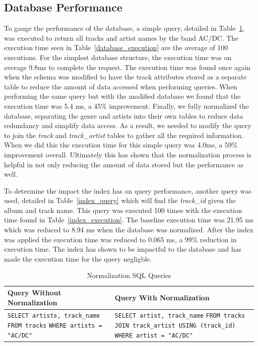 \documentclass{article}
\begin{document}
\subsection{Database Performance}
To gauge the performance of the database, a simple query, detailed in Table~\ref{database_query}, was executed to return all tracks and artist names by the band AC/DC. The execution time seen in Table~\ref{database_execution} are the average of 100 executions. For the simplest database structure, the execution time was on average 9.8ms to complete the request. The execution time was found once again when the schema was modified to have the track attributes stored as a separate table to reduce the amount of data accessed when performing queries. When performing the same query but with the modified database we found that the execution time was 5.4 ms, a 45\% improvement. Finally, we fully normalized the database, separating the genre and artists into their own tables to reduce data redundancy and simplify data access. As a result, we needed to modify the query to join the \textit{track} and \textit{track\_artist} tables to gather all the required information. When we did this the execution time for this simple query was 4.0ms, a 59\% improvement overall. Ultimately this has shown that the normalization process is helpful in not only reducing the amount of data stored but the performance as well. 

To determine the impact the index has on query performance, another query was used, detailed in Table~\ref{index_query} which will find the \textit{track\_id} given the album and track name. This query was executed 100 times with the execution time found in Table~\ref{index_execution}. The baseline execution time was 21.95 ms which was reduced to 8.94 ms when the database was normalized.  After the index was applied the execution time was reduced to 0.065 ms, a 99\% reduction in execution time. The index has shown to be impactful to the database and has made the execution time for the query negligble.

{
\linespread{1.1}\selectfont
\begin{table}
\caption{Normalization SQL Queries}
\label{database_query}
\centering
\begin{tabular}{p{5.25cm} p{8.25cm}}
  \hline
  Query Without Normalization & Query With Normalization \\
  \hline
  \verb|SELECT artists, track_name| \newline
  \verb|FROM tracks| \newline
  \verb|WHERE artists = "AC/DC"| &
  \verb|SELECT artist, track_name| \newline
  \verb|FROM tracks JOIN track_artist USING (track_id)| \newline
  \verb|WHERE artist = "AC/DC"| \\
  \hline
\end{tabular}
\end{table}
}
\end{document}
